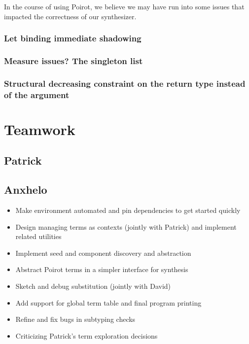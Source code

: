 \documentclass[review, sigplan]{acmart}
\begin{document}
In the
course of using Poirot, we believe we may have run into some issues that
impacted the correctness of our synthesizer.

\subsubsection{Let binding immediate shadowing}

\subsubsection{Measure issues? The singleton list}

\subsubsection{Structural decreasing constraint on the return type instead of the argument}


\section{Teamwork}

\subsection{Patrick}

\subsection{Anxhelo}
\begin{itemize}
  \item Make environment automated and pin dependencies to get started quickly
  \item Design managing terms as contexts (jointly with Patrick) and implement
    related utilities
  \item Implement seed and component discovery and abstraction
  \item Abstract Poirot terms in a simpler interface for synthesis
  \item Sketch and debug substitution (jointly with David)
  \item Add support for global term table and final program printing
  \item Refine and fix bugs in subtyping checks
  \item Criticizing Patrick's term exploration decisions
\end{itemize}
\end{document}
